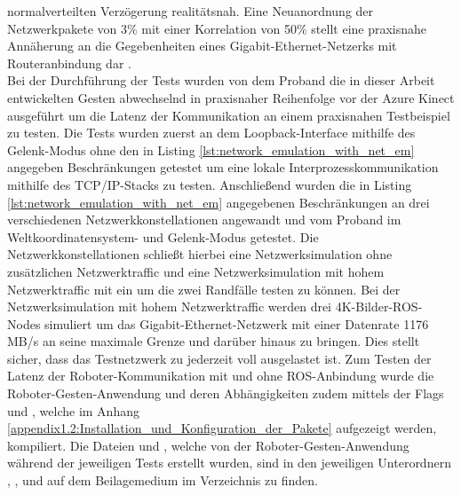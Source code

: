 normalverteilten Verzögerung realitätsnah. Eine Neuanordnung der Netzwerkpakete von 3\% mit einer Korrelation von 50\% stellt eine praxisnahe Annäherung an die Gegebenheiten eines Gigabit-Ethernet-Netzerks mit Routeranbindung dar \cite{admin_understanding_2018}.\\

Bei der Durchführung der Tests wurden von dem Proband die in dieser Arbeit entwickelten Gesten abwechselnd in praxisnaher Reihenfolge vor der Azure Kinect ausgeführt um die Latenz der Kommunikation an einem praxisnahen Testbeispiel zu testen. Die Tests wurden zuerst an dem Loopback-Interface mithilfe des Gelenk-Modus ohne den in Listing \ref{lst:network_emulation_with_net_em} angegeben Beschränkungen getestet um eine lokale Interprozesskommunikation mithilfe des TCP/IP-Stacks zu testen. Anschließend wurden die in Listing \ref{lst:network_emulation_with_net_em} angegebenen Beschränkungen an drei verschiedenen Netzwerkkonstellationen angewandt und vom Proband im Weltkoordinatensystem- und Gelenk-Modus getestet. Die Netzwerkkonstellationen schließt hierbei eine Netzwerksimulation ohne zusätzlichen Netzwerktraffic und eine Netzwerksimulation mit hohem Netzwerktraffic mit ein um die zwei Randfälle testen zu können. Bei der Netzwerksimulation mit hohem Netzwerktraffic werden drei 4K-Bilder-ROS-Nodes simuliert um das Gigabit-Ethernet-Netzwerk mit einer Datenrate 1176 MB/s an seine maximale Grenze und darüber hinaus zu bringen. Dies stellt sicher, dass das Testnetzwerk zu jederzeit voll ausgelastet ist. Zum Testen der Latenz der Roboter-Kommunikation mit und ohne ROS-Anbindung wurde die Roboter-Gesten-Anwendung und deren Abhängigkeiten zudem mittels der Flags  und , welche im Anhang \ref{appendix1.2:Installation_und_Konfiguration_der_Pakete} aufgezeigt werden, kompiliert. Die Dateien  und , welche von der Roboter-Gesten-Anwendung während der jeweiligen Tests erstellt wurden, sind in den jeweiligen Unterordnern , ,  und  auf dem Beilagemedium im Verzeichnis  zu finden.

